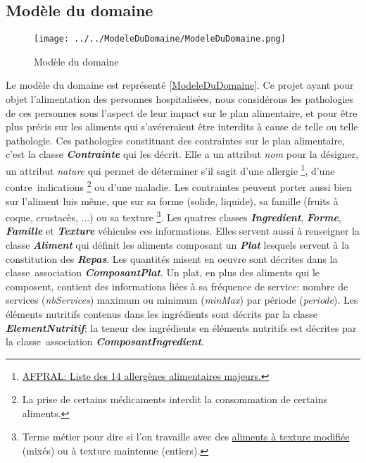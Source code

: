 \subsection{Modèle du domaine}
\begin{figure}
  \centering
      \texttt{[image: ../../ModeleDuDomaine/ModeleDuDomaine.png]} %
\caption{Modèle du domaine}
\label{ModeleDuDomaine}
\end{figure}

\newcommand{\classe}[1]{\emph{\textbf{#1}}}
\newcommand{\attribut}[1]{\emph{#1}}
\newcommand{\regleD}[1]{\textcolor{NavyBlue}{#1}}
\newcommand{\regleT}[1]{\textcolor{ForestGreen}{#1}}

Le modèle du domaine est représenté \autoref{ModeleDuDomaine}. Ce projet ayant pour objet l'alimentation des personnes hospitalisées, nous considérons les pathologies de ces personnes sous l'aspect de leur impact sur le plan alimentaire, et pour être plus précis sur les aliments qui s'avéreraient être interdits à cause de telle ou telle pathologie. Ces pathologies constituant des contraintes sur le plan alimentaire, c'est la classe \classe{Contrainte} qui les décrit. Elle a un attribut \attribut{nom} pour la désigner, un attribut \attribut{nature} qui permet de déterminer s'il sagit d'une allergie
\footnote{\label{allergies}\href{https://allergies.afpral.fr/allergie/en-savoir-plus-sur-les-allergies/alimentaires/89-liste-des-14-allergenes-alimentaires-majeurs}{AFPRAL: Liste des 14 allergènes alimentaires majeurs.}},
d'une contre~indications
\footnote{\label{contreIndications}La prise de certains médicaments interdit la consommation de certains aliments.}
ou d'une maladie.
Les contraintes peuvent porter aussi bien sur l'aliment luis même, que sur sa forme (solide, liquide), sa famille (fruits à coque, crustacès, ...) ou sa texture
\footnote{\label{textures}Terme métier pour dire si l'on travaille avec des \href{http://plone.vermeil.org:8080/ehpad/Bibliotheque/Memoires/annee-2012-2013/07 - Les textures modifiees et le plaisir de manger de Jacques Caby.pdf}{aliments à texture modifiée} (mixés) ou à texture maintenue (entiers).}.
Les quatres classes \classe{Ingredient}, \classe{Forme}, \classe{Famille} et \classe{Texture} véhicules ces informations. Elles servent aussi à renseigner la classe \classe{Aliment} qui définit les aliments composant un \classe{Plat} lesquels servent à la constitution des \classe{Repas}. Les quantités misent en oeuvre sont décrites dans la classe~association \classe{ComposantPlat}. Un plat, en plus des aliments qui le composent, contient des informations liées à sa fréquence de service: nombre de services (\attribut{nbServices}) maximum ou minimum (\attribut{minMax}) par période (\attribut{periode}). Les éléments nutritifs contenus dans les ingrédients sont décrits par la classe \classe{ElementNutritif}; la teneur des ingrédients en éléments nutritifs est décrites par la classe~association \classe{ComposantIngredient}.

